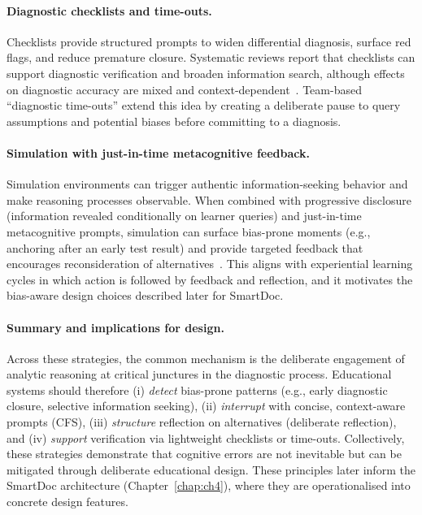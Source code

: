 \paragraph{Diagnostic checklists and time-outs.}
Checklists provide structured prompts to widen differential diagnosis, surface red flags, and reduce premature closure. Systematic reviews report that checklists can support diagnostic verification and broaden information search, although effects on diagnostic accuracy are mixed and context-dependent~\parencite{bmjopen_checklists_2022,ahrq_checklists_2020,graber_cognitive_interventions_2012}. Team-based ``diagnostic time-outs'' extend this idea by creating a deliberate pause to query assumptions and potential biases before committing to a diagnosis.

\paragraph{Simulation with just-in-time metacognitive feedback.}
Simulation environments can trigger authentic information-seeking behavior and make reasoning processes observable. When combined with progressive disclosure (information revealed conditionally on learner queries) and just-in-time metacognitive prompts, simulation can surface bias-prone moments (e.g., anchoring after an early test result) and provide targeted feedback that encourages reconsideration of alternatives~\parencite{graber_cognitive_interventions_2012,croskerry_advances_2005}. This aligns with experiential learning cycles in which action is followed by feedback and reflection, and it motivates the bias-aware design choices described later for SmartDoc.

\paragraph{Summary and implications for design.}
Across these strategies, the common mechanism is the deliberate engagement of
analytic reasoning at critical junctures in the diagnostic process. Educational
systems should therefore (i) \emph{detect} bias-prone patterns (e.g., early
diagnostic closure, selective information seeking), (ii) \emph{interrupt} with
concise, context-aware prompts (CFS), (iii) \emph{structure} reflection on
alternatives (deliberate reflection), and (iv) \emph{support} verification via
lightweight checklists or time-outs. Collectively, these strategies demonstrate
that cognitive errors are not inevitable but can be mitigated through deliberate
educational design. These principles later inform the SmartDoc architecture
(Chapter~\ref{chap:ch4}), where they are operationalised into concrete design
features.


